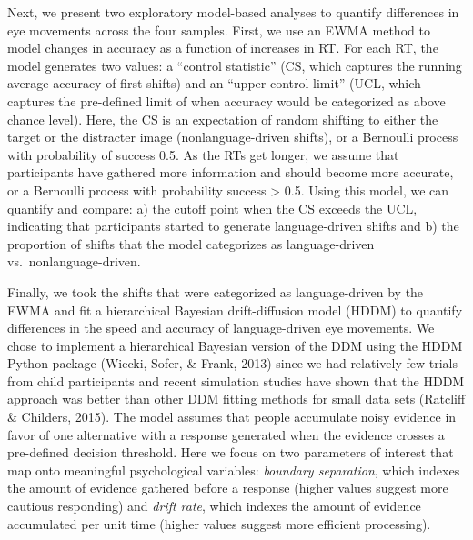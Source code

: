 \documentclass[10pt, letterpaper]{article}
\begin{document}
Next, we present two exploratory model-based analyses to quantify
differences in eye movements across the four samples. First, we use an
EWMA method to model changes in accuracy as a function of increases in
RT. For each RT, the model generates two values: a ``control statistic''
(CS, which captures the running average accuracy of first shifts) and an
``upper control limit'' (UCL, which captures the pre-defined limit of
when accuracy would be categorized as above chance level). Here, the CS
is an expectation of random shifting to either the target or the
distracter image (nonlanguage-driven shifts), or a Bernoulli process
with probability of success 0.5. As the RTs get longer, we assume that
participants have gathered more information and should become more
accurate, or a Bernoulli process with probability success \textgreater{}
0.5. Using this model, we can quantify and compare: a) the cutoff point
when the CS exceeds the UCL, indicating that participants started to
generate language-driven shifts and b) the proportion of shifts that the
model categorizes as language-driven vs.~nonlanguage-driven.

Finally, we took the shifts that were categorized as language-driven by
the EWMA and fit a hierarchical Bayesian drift-diffusion model (HDDM) to
quantify differences in the speed and accuracy of language-driven eye
movements. We chose to implement a hierarchical Bayesian version of the
DDM using the HDDM Python package (Wiecki, Sofer, \& Frank, 2013) since
we had relatively few trials from child participants and recent
simulation studies have shown that the HDDM approach was better than
other DDM fitting methods for small data sets (Ratcliff \& Childers,
2015). The model assumes that people accumulate noisy evidence in favor
of one alternative with a response generated when the evidence crosses a
pre-defined decision threshold. Here we focus on two parameters of
interest that map onto meaningful psychological variables:
\emph{boundary separation}, which indexes the amount of evidence
gathered before a response (higher values suggest more cautious
responding) and \emph{drift rate}, which indexes the amount of evidence
accumulated per unit time (higher values suggest more efficient
processing).
\end{document}
